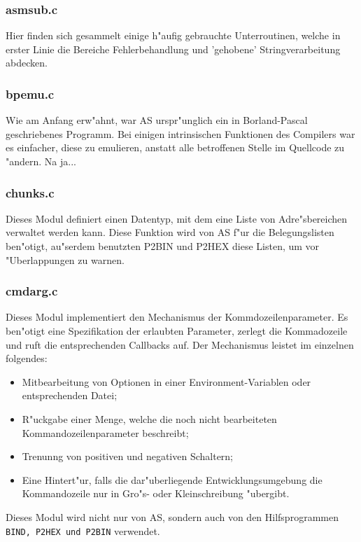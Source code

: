 \documentclass[12pt,a4paper,twoside]{report}
\newcommand{\tty}[1]{{\tt #1}}
\begin{document}
{\subsubsection{asmsub.c}

Hier finden sich gesammelt einige h"aufig gebrauchte Unterroutinen, welche
in erster Linie die Bereiche Fehlerbehandlung und 'gehobene'
Stringverarbeitung abdecken.

\subsubsection{bpemu.c}

Wie am Anfang erw"ahnt, war AS urspr"unglich ein in Borland-Pascal
geschriebenes Programm.  Bei einigen intrinsischen Funktionen des
Compilers war es einfacher, diese zu emulieren, anstatt alle betroffenen
Stelle im Quellcode zu "andern. Na ja...

\subsubsection{chunks.c}

Dieses Modul definiert einen Datentyp, mit dem eine Liste von
Adre"sbereichen verwaltet werden kann.  Diese Funktion wird von AS
f"ur die Belegungslisten ben"otigt, au"serdem benutzten P2BIN und
P2HEX diese Listen, um vor "Uberlappungen zu warnen.

\subsubsection{cmdarg.c}

Dieses Modul implementiert den Mechanismus der Kommdozeilenparameter.  Es
ben"otigt eine Spezifikation der erlaubten Parameter, zerlegt die
Kommadozeile und ruft die entsprechenden Callbacks auf.  Der Mechanismus
leistet im einzelnen folgendes:
\begin{itemize}
\item{Mitbearbeitung von Optionen in einer Environment-Variablen oder
      entsprechenden Datei;}
\item{R"uckgabe einer Menge, welche die noch nicht bearbeiteten
      Kommandozeilenparameter beschreibt;}
\item{Trenunng von positiven und negativen Schaltern;}
\item{Eine Hintert"ur, falls die dar"uberliegende Entwicklungsumgebung die
      Kommandozeile nur in Gro"s- oder Kleinschreibung "ubergibt.}
\end{itemize}
Dieses Modul wird nicht nur von AS, sondern auch von den Hilfsprogrammen
\tty{BIND, P2HEX und P2BIN} verwendet.

}
\end{document}
